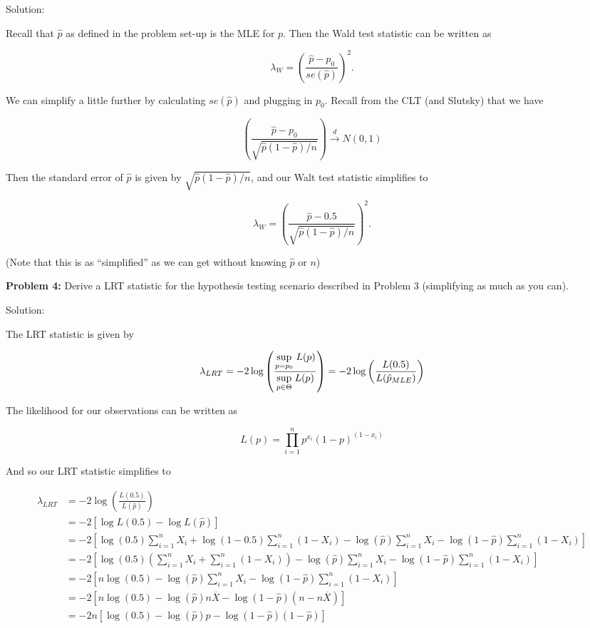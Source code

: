 \documentclass[
  letterpaper,
  DIV=11,
  numbers=noendperiod]{scrreprt}
\begin{document}
Solution:

Recall that \(\hat{p}\) as defined in the problem set-up is the MLE for
\(p\). Then the Wald test statistic can be written as

\[
\lambda_W = \left( \frac{\hat{p} - p_0}{se(\hat{p})}\right)^2.
\]

We can simplify a little further by calculating \(se(\hat{p})\) and
plugging in \(p_0\). Recall from the CLT (and Slutsky) that we have

\[
\left( \frac{\hat{p} - p_0}{\sqrt{\hat{p}(1 - \hat{p})/n}} \right) \overset{d}{\to} N(0,1)
\]

Then the standard error of \(\hat{p}\) is given by
\(\sqrt{\hat{p}(1 - \hat{p})/n}\), and our Walt test statistic
simplifies to

\[
\lambda_W = \left( \frac{\hat{p} - 0.5}{\sqrt{\hat{p}(1 - \hat{p})/n}}\right)^2.
\]

(Note that this is as ``simplified'' as we can get without knowing
\(\hat{p}\) or \(n\))

\textbf{Problem 4:} Derive a LRT statistic for the hypothesis testing
scenario described in Problem 3 (simplifying as much as you can).

Solution:

The LRT statistic is given by

\[
\lambda_{LRT} = -2 \log\left(\frac{\underset{p = p_0}{\text{sup}} \hspace{1mm} L(p)}{\underset{p \in \Theta}{\text{sup}} \hspace{1mm} L(p)} \right)= -2 \log\left(\frac{ L(0.5)} {L(\hat{p}_{MLE})} \right)
\]

The likelihood for our observations can be written as

\[
L(p) = \prod_{i = 1}^n p^{x_i} (1 - p)^{(1 - x_i)}
\]

And so our LRT statistic simplifies to

\begin{align*}
\lambda_{LRT} & = -2 \log\left(\frac{ L(0.5)} {L(\hat{p})} \right) \\
& = -2 \left[\log L(0.5) - \log L(\hat{p}) \right] \\
& = -2 \left[ \log(0.5) \sum_{i = 1}^n X_i + \log(1 - 0.5)\sum_{i = 1}^n(1 - X_i) - \log(\hat{p}) \sum_{i = 1}^n X_i - \log(1 - \hat{p})\sum_{i = 1}^n(1 - X_i)\right] \\
& = -2 \left[ \log(0.5) \left( \sum_{i = 1}^n X_i + \sum_{i = 1}^n(1 - X_i)\right) - \log(\hat{p}) \sum_{i = 1}^n X_i - \log(1 - \hat{p})\sum_{i = 1}^n(1 - X_i)\right] \\
& = -2 \left[ n\log(0.5) - \log(\hat{p}) \sum_{i = 1}^n X_i - \log(1 - \hat{p})\sum_{i = 1}^n(1 - X_i)\right] \\
& = -2 \left[ n\log(0.5) - \log(\hat{p}) n \overline{X} - \log(1 - \hat{p}) (n - n \overline{X})\right] \\
& = -2 n \left[ \log(0.5) - \log(\hat{p}) \hat{p} - \log(1 - \hat{p}) (1 -  \hat{p})\right]
\end{align*}
\end{document}
